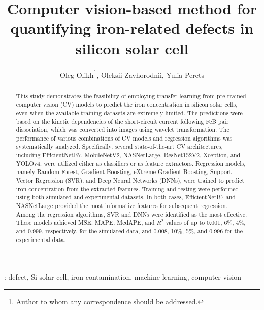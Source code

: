\documentclass[10pt]{iopart}
\begin{document}
\title[Computer vision for quantifying Fe-related defects in Si solar cell]{Computer vision-based method for quantifying iron-related defects in silicon solar cell}

\author{Oleg Olikh\footnote{Author to whom any correspondence should be addressed.}, Oleksii Zavhorodnii, Yulia Perets}

\address{Taras Shevchenko National University of Kyiv, Kyiv 01601, Ukraine}


\begin{abstract}
This study demonstrates the feasibility of employing transfer learning from pre-trained computer vision (CV) models
to predict the iron concentration in silicon solar cells, even when the available training datasets are extremely limited.
The predictions were based on the kinetic dependencies of the short-circuit current following FeB pair dissociation,
which was converted into images using wavelet transformation.
The performance of various combinations of CV models and regression algorithms was systematically analyzed.
Specifically, several state-of-the-art CV architectures,
including EfficientNetB7, MobileNetV2, NASNetLarge, ResNet152V2, Xception, and YOLOv4,
were utilized either as classifiers or as feature extractors.
Regression models, namely Random Forest, Gradient Boosting, eXtreme Gradient Boosting, Support Vector Regression (SVR),
and Deep Neural Networks (DNNs), were trained to predict iron concentration from the extracted features.
Training and testing were performed using both simulated and experimental datasets.
In both cases, EfficientNetB7 and NASNetLarge provided the most informative features for subsequent regression.
Among the regression algorithms, SVR and DNNs were identified as the most effective.
These models achieved MSE, MAPE, MedAPE, and $R^2$ values of up
to 0.001, 6\%, 4\%, and 0.999, respectively, for the simulated data,
and 0.008, 10\%, 5\%, and 0.996 for the experimental data.
\end{abstract}

%
\vspace{2pc}
: defect, Si solar cell, iron contamination, machine learning, computer vision

\submitto{\SST}
%
\end{document}
